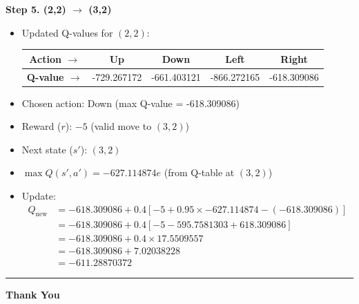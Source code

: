 \documentclass{article}
\begin{document}
\begin{itemize}
\noindent\textbf{Step 5. (2,2) \(\rightarrow\) (3,2)}
\begin{itemize}
    \item Updated Q-values for \((2,2)\):
    \begin{tabular}{|c|c|c|c|c|}
        \textbf{Action $\rightarrow$ } & Up & Down & Left & Right \\
        \hline
        \textbf{Q-value $\rightarrow$ } &-729.267172 & -661.403121 & -866.272165 & -618.309086 \\
    \end{tabular}
    \vspace{10pt}
    \item Chosen action: Down (max Q-value = -618.309086)
    \item Reward (\(r\)): \(-5\) (valid move to \((3,2)\))
    \item Next state (\(s'\)): \((3,2)\)
    \item \(\max Q(s', a') = -627.114874e\) (from Q-table at \((3,2)\))
    \item Update:
    \begin{align*}
        Q_{\text{new}} &= -618.309086 + 0.4 \left[ -5 + 0.95 \times -627.114874 - (-618.309086) \right] \\
        &= -618.309086 + 0.4 \left[ -5 - 595.7581303 + 618.309086 \right] \\
        &= -618.309086 + 0.4 \times 17.5509557 \\
        &= -618.309086 + 7.02038228 \\
        &= -611.28870372
    \end{align*}
\end{itemize}

\end{itemize}
\hrule
\vspace{4cm}

\begin{center}
    \Huge{\textbf{Thank You}}
\end{center}
\end{document}
